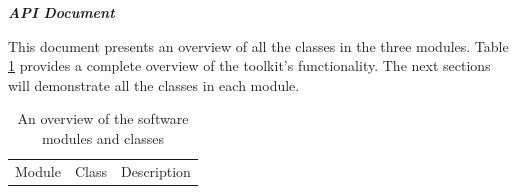 \documentclass[11pt, letterpaper]{article}
\begin{document}
\noindent
\textbf{\textit{API Document}}
\vskip0.5cm
\linenumbers

\noindent
This document presents an overview of all the classes in the three modules.
Table \ref{tab:overview} provides a complete overview of the toolkit's functionality.
The next sections will demonstrate all the classes in each module.
\begin{table}[htbp]   \footnotesize
    \centering
    \caption{An overview of the software modules and classes}\label{tab:overview}
    \begin{tabular}{ccl}
        \hline
        Module                                                                      & Class                                                         & Description                                                                                                                                                                                                            \\


\end{tabular}
\end{table}
\end{document}
